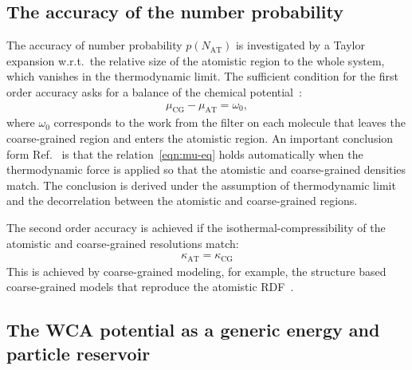 \documentclass[epjST]{svjour}
\newcommand{\AT}[0]{\textrm{AT}}
\newcommand{\CG}[0]{\textrm{CG}}
\begin{document}
\subsection{The accuracy of the number probability}

The accuracy of number probability $p(N_\AT)$ is investigated by a
Taylor expansion w.r.t.~the relative size of the atomistic region to
the whole system, which vanishes in the thermodynamic limit. The sufficient condition for the first order accuracy
asks for a balance of the chemical potential~\cite{wang2013grand}:
\begin{align}\label{eqn:mu-eq}
  \mu_\CG - \mu_\AT = \omega_0,
\end{align}
where $\omega_0$ corresponds to the work from the filter on each
molecule that leaves the coarse-grained region and  enters the atomistic region. An important conclusion
form Ref.~\cite{wang2013grand} is that the relation~\eqref{eqn:mu-eq}
holds automatically when the thermodynamic force is applied so that the atomistic
and coarse-grained densities match. The conclusion is derived under
the assumption of thermodynamic limit and the decorrelation between the
atomistic and coarse-grained regions.

The second order accuracy is achieved if the isothermal-compressibility of the atomistic and coarse-grained resolutions match:
\begin{align}
  \kappa_\AT = \kappa_\CG
\end{align}
This is achieved by coarse-grained modeling, for example, the
structure based coarse-grained models that reproduce the atomistic
RDF~\cite{wang2009comparative}.

\subsection{The WCA potential as a generic energy and particle reservoir}
\end{document}
